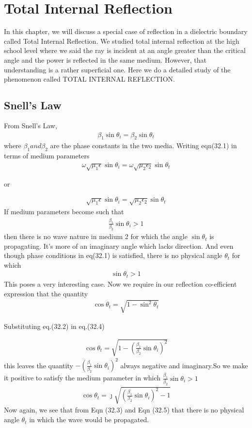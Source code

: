 \chapter{Total Internal Reflection}

In this chapter, we will discuss a special case of reflection in a dielectric boundary called Total Internal Reflection. We studied total internal reflection at the high school level where we said the ray is incident at an angle greater than the critical angle and the power is reflected in the same medium. However, that understanding is a rather superficial one. Here we do a detailed study of the phenomenon called TOTAL INTERNAL REFLECTION.

\section{Snell's Law}
From Snell's Law,
\begin{align}
\beta_1 \sin\theta_i = \beta_2 \sin\theta_t
\end{align}
where $\beta_1 and \beta_2$ are the phase constants in the two media. Writing eqn(32.1) in terms of medium parameters
\begin{align*}
\omega\sqrt{\mu_1\epsilon} \sin\theta_i = \omega\sqrt{\mu_2\epsilon_2}  \sin\theta_t
\end{align*}
\begin{center}
or
\end{center}
\begin{align*}
\sqrt{\mu_1\epsilon} \sin\theta_i = \sqrt{\mu_2\epsilon_2}  \sin\theta_t
\end{align*}
If medium parameters become such that
\begin{align}
\frac{\beta_1}{\beta_2}\sin\theta_i > 1
\end{align}then there is no wave nature in medium 2 for which the angle $\sin\theta_t$ is propagating. It's more of an imaginary angle which lacks direction.
And even though phase conditions in eq(32.1) is satisfied, there is no physical angle $\theta_t$ for which
\begin{align}
\sin\theta_t > 1
\end{align}
This poses a very interesting case. Now we require in our reflection co-efficient expression that the quantity
\begin{align}
\cos\theta_t = \sqrt{1-\sin^2\theta_t}
\end{align}
\begin{center}
Substituting eq.(32.2) in eq.(32.4)
\end{center}
\begin{align*}
\cos\theta_t = \sqrt{1-(\frac{\beta_1}{\beta_2}\sin\theta_i)^2}
\end{align*}
this leaves the quantity $-(\frac{\beta_1}{\beta_2}\sin\theta_i)^2$ always negative and imaginary.So we make it positive to satisfy the medium parameter in which $\frac{\beta_1}{\beta_2}\sin\theta_i > 1$
\begin{align}
\cos\theta_t = \jmath\sqrt{(\frac{\beta_1}{\beta_2}\sin\theta_i)^2-1}
\end{align}
Now again, we see that from Eqn (32.3) and Eqn (32.5) 
that there is no physical angle $\theta_t$ in which the wave would be propagated.

